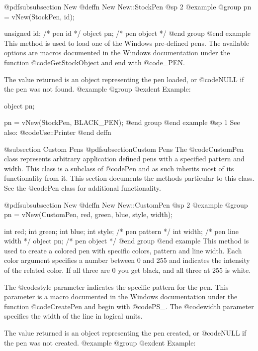 @pdfsubsubsection {New}
@deffn {New} New::StockPen
@sp 2
@example
@group
pn = vNew(StockPen, id);

unsigned id;    /*  pen id      */
object  pn;     /*  pen object  */
@end group
@end example
This method is used to load one of the Windows pre-defined pens.
The available options are macros documented in the Windows documentation
under the function @code{GetStockObject} and end with @code{_PEN}.

The value returned is an object representing the pen loaded, or
@code{NULL} if the pen was not found.
@example
@group
@exdent Example:

object  pn;

pn = vNew(StockPen, BLACK_PEN);
@end group
@end example
@sp 1
See also:  @code{Use::Printer}
@end deffn







@subsection Custom Pens
@pdfsubsection{Custom Pens}
The @code{CustomPen} class represents arbitrary application defined pens
with a specified pattern and width.  This class is a subclass of
@code{Pen} and as such inherits most of its functionality from it.  This
section documents the methods particular to this class.  See the
@code{Pen} class for additional functionality.






@pdfsubsubsection {New}
@deffn {New} New::CustomPen
@sp 2
@example
@group
pn = vNew(CustomPen, red, green, blue, style, width);

int     red;
int     green;
int     blue;
int     style;  /*  pen pattern     */
int     width;  /*  pen line width  */
object  pn;     /*  pen object      */
@end group
@end example
This method is used to create a colored pen with specific colors,
pattern and line width.  Each color argument specifies a number between
0 and 255 and indicates the intensity of the related color.  If all
three are 0 you get black, and all three at 255 is white.

The @code{style} parameter indicates the specific pattern for the pen.
This parameter is a macro documented in the Windows documentation under
the function @code{CreatePen} and begin with @code{PS_}.
The @code{width} parameter specifies the width of the line in logical
units.

The value returned is an object representing the pen created, or
@code{NULL} if the pen was not created.
@example
@group
@exdent Example:

